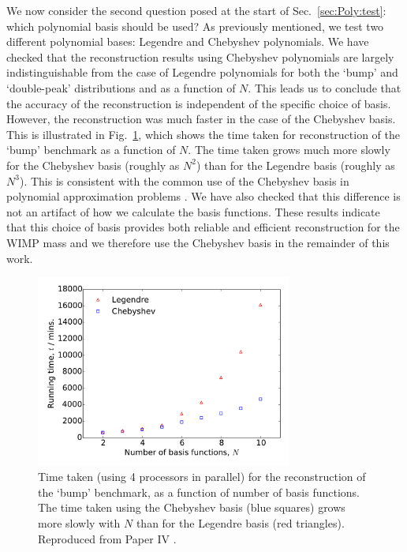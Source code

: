 We now consider the second question posed at the start of Sec.~\ref{sec:Poly:test}: which polynomial basis should be used? As previously mentioned, we test two different polynomial bases: Legendre and Chebyshev polynomials. We have checked that the reconstruction results using Chebyshev polynomials are largely indistinguishable from the case of Legendre polynomials for both the `bump' and `double-peak' distributions and as a function of $N$. This leads us to conclude that the accuracy of the reconstruction is independent of the specific choice of basis. However, the reconstruction was much faster in the case of the Chebyshev basis. This is illustrated in Fig.~\ref{fig:Poly:times}, which shows the time taken for reconstruction of the `bump' benchmark as a function of $N$. The time taken grows much more slowly for the Chebyshev basis (roughly as $N^2$) than for the Legendre basis (roughly as $N^3$). This is consistent with the common use of the Chebyshev basis in polynomial approximation problems \cite{Mason:2002}. We have also checked that this difference is not an artifact of how we calculate the basis functions. These results indicate that this choice of basis provides both reliable and efficient reconstruction for the WIMP mass and we therefore use the Chebyshev basis in the remainder of this work.

\begin{figure}[ht!]
\centering
  \includegraphics[width=0.75\textwidth]{Poly/RunTimes.pdf}
  \caption[Time taken for the reconstruction of the `bump' benchmark as a function of number of basis functions for both the Chebyshev and Legendre bases]{Time taken (using 4 processors in parallel) for the reconstruction of the `bump' benchmark, as a function of number of basis functions. The time taken using the Chebyshev basis (blue squares) grows more slowly with $N$ than for the Legendre basis (red triangles). Reproduced from Paper IV \cite{Kavanagh:2014}.}
  \label{fig:Poly:times}
\end{figure}

